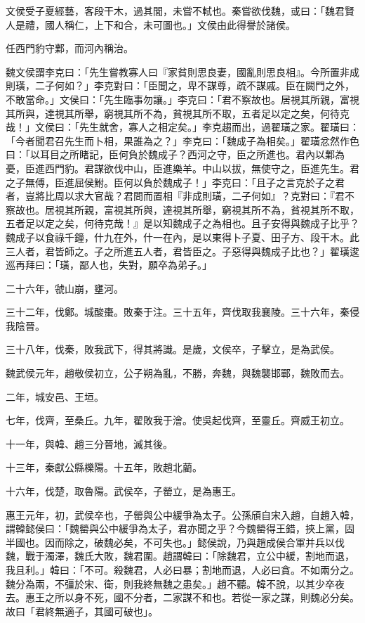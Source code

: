 \begin{pinyinscope}
文侯受子夏經藝，客段干木，過其閭，未嘗不軾也。秦嘗欲伐魏，或曰：「魏君賢人是禮，國人稱仁，上下和合，未可圖也。」文侯由此得譽於諸侯。

任西門豹守鄴，而河內稱治。

魏文侯謂李克曰：「先生嘗教寡人曰『家貧則思良妻，國亂則思良相』。今所置非成則璜，二子何如？」李克對曰：「臣聞之，卑不謀尊，疏不謀戚。臣在闕門之外，不敢當命。」文侯曰：「先生臨事勿讓。」李克曰：「君不察故也。居視其所親，富視其所與，達視其所舉，窮視其所不為，貧視其所不取，五者足以定之矣，何待克哉！」文侯曰：「先生就舍，寡人之相定矣。」李克趨而出，過翟璜之家。翟璜曰：「今者聞君召先生而卜相，果誰為之？」李克曰：「魏成子為相矣。」翟璜忿然作色曰：「以耳目之所睹記，臣何負於魏成子？西河之守，臣之所進也。君內以鄴為憂，臣進西門豹。君謀欲伐中山，臣進樂羊。中山以拔，無使守之，臣進先生。君之子無傅，臣進屈侯鮒。臣何以負於魏成子！」李克曰：「且子之言克於子之君者，豈將比周以求大官哉？君問而置相『非成則璜，二子何如』？克對曰：『君不察故也。居視其所親，富視其所與，達視其所舉，窮視其所不為，貧視其所不取，五者足以定之矣，何待克哉！』是以知魏成子之為相也。且子安得與魏成子比乎？魏成子以食祿千鐘，什九在外，什一在內，是以東得卜子夏、田子方、段干木。此三人者，君皆師之。子之所進五人者，君皆臣之。子惡得與魏成子比也？」翟璜逡巡再拜曰：「璜，鄙人也，失對，願卒為弟子。」

二十六年，虢山崩，壅河。

三十二年，伐鄭。城酸棗。敗秦于注。三十五年，齊伐取我襄陵。三十六年，秦侵我陰晉。

三十八年，伐秦，敗我武下，得其將識。是歲，文侯卒，子擊立，是為武侯。

魏武侯元年，趙敬侯初立，公子朔為亂，不勝，奔魏，與魏襲邯鄲，魏敗而去。

二年，城安邑、王垣。

七年，伐齊，至桑丘。九年，翟敗我于澮。使吳起伐齊，至靈丘。齊威王初立。

十一年，與韓、趙三分晉地，滅其後。

十三年，秦獻公縣櫟陽。十五年，敗趙北藺。

十六年，伐楚，取魯陽。武侯卒，子罃立，是為惠王。

惠王元年，初，武侯卒也，子罃與公中緩爭為太子。公孫頎自宋入趙，自趙入韓，謂韓懿侯曰：「魏罃與公中緩爭為太子，君亦聞之乎？今魏罃得王錯，挾上黨，固半國也。因而除之，破魏必矣，不可失也。」懿侯說，乃與趙成侯合軍并兵以伐魏，戰于濁澤，魏氏大敗，魏君圍。趙謂韓曰：「除魏君，立公中緩，割地而退，我且利。」韓曰：「不可。殺魏君，人必曰暴；割地而退，人必曰貪。不如兩分之。魏分為兩，不彊於宋、衛，則我終無魏之患矣。」趙不聽。韓不說，以其少卒夜去。惠王之所以身不死，國不分者，二家謀不和也。若從一家之謀，則魏必分矣。故曰「君終無適子，其國可破也」。


\end{pinyinscope}
